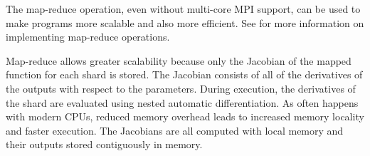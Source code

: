 The map-reduce operation, even without multi-core MPI support, can be
used to make programs more scalable and also more efficient.   See
 for more information on implementing
map-reduce operations.

Map-reduce allows greater scalability because only the Jacobian of the
mapped function for each shard is stored.  The Jacobian consists of
all of the derivatives of the outputs with respect to the parameters.
During execution, the derivatives of the shard are evaluated using
nested automatic differentiation.  As often happens with modern CPUs,
reduced memory overhead leads to increased memory locality and faster
execution.  The Jacobians are all computed with local memory and their
outputs stored contiguously in memory.
